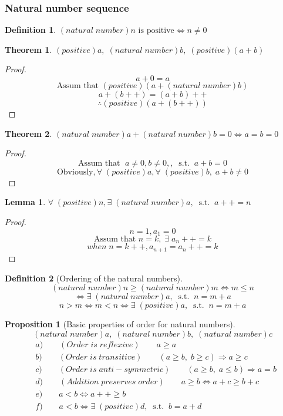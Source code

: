 \documentclass[a4paper]{report}
\theoremstyle{definition}
\newtheorem{definition}{Definition}[subsection]
\newtheorem{lemma}{Lemma}[subsubsection]
\newtheorem{proposition}{Proposition}[definition]
\newtheorem{theorem}{Theorem}[subsection]
\newcommand{\nn}{(natural\;number)}
\newcommand{\at}{\text{Assum that }}
\newcommand{\exforall}{\forall\;}
\newcommand{\st}{,\;\operatorname{s.t.}\;}
\newcommand{\exexists}{\exists\;}
\begin{document}
\subsubsection{Natural number sequence}
\begin{definition}
    $\nn n\text{ is positive}\Leftrightarrow n\neq 0$
\end{definition}
\begin{theorem}
    $(positive)a,\;\nn b,\;(positive)(a+b)$
\end{theorem}
\begin{proof}
    $$a+0=a$$
    $$\at (positive)(a+\nn b)$$
    $$a+(b++)=(a+b)++$$
    $$\therefore (positive)(a+(b++))$$
\end{proof}
\begin{theorem}
    $\nn a+\nn b=0\Leftrightarrow a=b=0$
\end{theorem}
\begin{proof}
    $$\at\;a\neq0,b\neq0,\st a+b=0$$
    $$\text{Obviously},\exforall(positive)a,\exforall(positive)b,\;a+b\neq0$$
\end{proof}
\begin{lemma}
    $\exforall(positive)n,\exexists\nn a\st a++=n$
\end{lemma}
\begin{proof}
    $$n=1,a_1=0$$
    $$\at n=k,\;\exexists a_n++=k$$
    $$when\;n=k++,a_{n+1}=a_{n}++=k$$
\end{proof}
\begin{definition}[Ordering of the natural numbers]
    $$\nn n\geq\nn m\Leftrightarrow m\leq n$$
    $$\Leftrightarrow\exexists\nn a\st n=m+a$$
    $$n>m\Leftrightarrow m<n\Leftrightarrow\exexists(positive) a\st n=m+a$$
\end{definition}
\begin{proposition}[Basic properties of order for natural numbers]
    $$\nn a,\;\nn b,\;\nn c$$
    $$\begin{aligned}
        &a)\qquad(Order\;is\;reflexive)\qquad a\geq a\\
        &b)\qquad(Order\;is\;transitive)\qquad (a\geq b,\;b\geq c)\Rightarrow a\geq c\\
        &c)\qquad(Order\;is\;anti-symmetric)\qquad (a\geq b,\;a\leq b)\Rightarrow a=b\\
        &d)\qquad(Addition\;preserves\;order)\qquad a\geq b\Leftrightarrow a+c\geq b+c\\
        &e)\qquad a<b\Leftrightarrow a++\geq b\\
        &f)\qquad a<b\Leftrightarrow \exexists(positive)d\st b=a+d
    \end{aligned}$$
\end{proposition}
\end{document}

